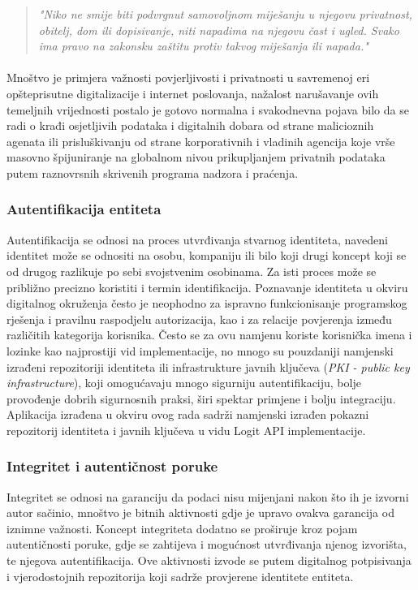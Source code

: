 \begin{quote}
\textit{"Niko ne smije biti podvrgnut samovoljnom miješanju u njegovu privatnost, obitelj, dom ili dopisivanje, niti napadima na njegovu čast i ugled. Svako ima pravo na zakonsku zaštitu protiv takvog miješanja ili napada."}
\end{quote}

\paragraph*{}
Mnoštvo je primjera važnosti povjerljivosti i privatnosti u savremenoj eri opšteprisutne digitalizacije i internet poslovanja, nažalost narušavanje ovih temeljnih vrijednosti postalo je gotovo normalna i svakodnevna pojava bilo da se radi o krađi osjetljivih podataka i digitalnih dobara od strane malicioznih agenata ili prisluškivanju od strane korporativnih i vladinih agencija koje vrše masovno špijuniranje na globalnom nivou prikupljanjem privatnih podataka putem raznovrsnih skrivenih programa nadzora i praćenja\cite{wleaks}.

\subsubsection*{Autentifikacija entiteta}
Autentifikacija se odnosi na proces utvrđivanja stvarnog identiteta, navedeni identitet može se odnositi na osobu, kompaniju ili bilo koji drugi koncept koji se od drugog razlikuje po sebi svojstvenim osobinama. Za isti proces može se približno precizno koristiti i termin identifikacija. Poznavanje identiteta u okviru digitalnog okruženja često je neophodno za ispravno funkcionisanje programskog rješenja i pravilnu raspodjelu autorizacija, kao i za relacije povjerenja između različitih kategorija korisnika. Često se za ovu namjenu koriste korisnička imena i lozinke kao najprostiji vid implementacije, no mnogo su pouzdaniji namjenski izrađeni repozitoriji identiteta ili infrastrukture javnih ključeva (\textit{PKI - public key infrastructure}), koji omogućavaju mnogo sigurniju autentifikaciju, bolje provođenje dobrih sigurnosnih praksi, širi spektar primjene i bolju integraciju. Aplikacija izrađena u okviru ovog rada sadrži namjenski izrađen pokazni repozitorij identiteta i javnih ključeva u vidu Logit API implementacije.

\subsubsection*{Integritet i autentičnost poruke}
Integritet se odnosi na garanciju da podaci nisu mijenjani nakon što ih je izvorni autor sačinio, mnoštvo je bitnih aktivnosti gdje je upravo ovakva garancija od iznimne važnosti. Koncept integriteta dodatno se proširuje kroz pojam autentičnosti poruke, gdje se zahtijeva i mogućnost utvrđivanja njenog izvorišta, te njegova autentifikacija. Ove aktivnosti izvode se putem digitalnog potpisivanja i vjerodostojnih repozitorija koji sadrže provjerene identitete entiteta.

